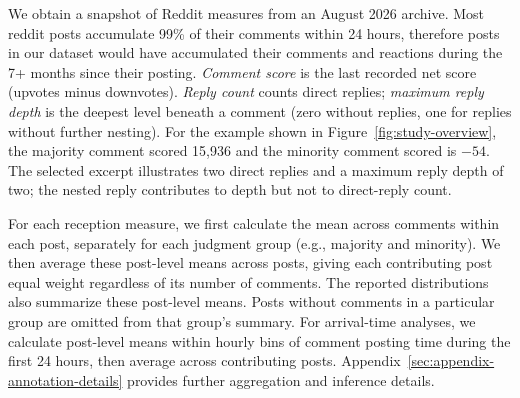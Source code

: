 
We obtain a snapshot of Reddit measures from an August 2026 archive. Most reddit posts accumulate 99\% of their comments within 24 hours, therefore posts in our dataset would have accumulated their comments and reactions during the 7+ months since their posting.
\emph{Comment score} is the last recorded net score (upvotes minus downvotes).
\emph{Reply count} counts direct replies; \emph{maximum reply depth}
is the deepest level beneath a comment (zero without replies,
one for replies without further nesting). 
For the example shown in Figure~\ref{fig:study-overview}, 
the majority comment scored 15,936 and the minority comment  
scored is $-54$. The selected excerpt illustrates two direct replies
and a maximum reply depth of two; the nested reply contributes
to depth but not to direct-reply count.

For each reception measure, we first calculate the mean across comments within each post, separately for each judgment group (e.g., majority and minority). We then average these post-level means across posts, giving each contributing post equal weight regardless of its number of comments. The reported distributions also summarize these post-level means. Posts without comments in a particular group are omitted from that group’s summary.
For arrival-time analyses, we calculate post-level means within hourly bins of comment posting time during the first 24 hours, then average across contributing posts. 
Appendix~\ref{sec:appendix-annotation-details} provides further
aggregation and inference details.



